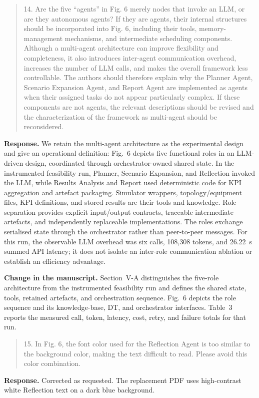 \documentclass[11pt]{article}
\newenvironment{reviewercomment}{\begin{quote}\color{reviewblue}}{\end{quote}}
\newenvironment{authorresponse}{\color{responsegreen}\textbf{Response.} }{\par\color{black}}
\newcommand{\change}[1]{\par\textbf{Change in the manuscript.} #1\par}
\begin{document}
\begin{reviewercomment}
14. Are the five ``agents'' in Fig. 6 merely nodes that invoke an LLM, or are they autonomous agents? If they are agents, their internal structures should be incorporated into Fig. 6, including their tools, memory-management mechanisms, and intermediate scheduling components. Although a multi-agent architecture can improve flexibility and completeness, it also introduces inter-agent communication overhead, increases the number of LLM calls, and makes the overall framework less controllable. The authors should therefore explain why the Planner Agent, Scenario Expansion Agent, and Report Agent are implemented as agents when their assigned tasks do not appear particularly complex. If these components are not agents, the relevant descriptions should be revised and the characterization of the framework as multi-agent should be reconsidered.
\end{reviewercomment}
\begin{authorresponse}
We retain the multi-agent architecture as the experimental design and give an operational definition: Fig.~6 depicts five functional roles in an LLM-driven design, coordinated through orchestrator-owned shared state. In the instrumented feasibility run, Planner, Scenario Expansion, and Reflection invoked the LLM, while Results Analysis and Report used deterministic code for KPI aggregation and artefact packaging. Simulator wrappers, topology/equipment files, KPI definitions, and stored results are their tools and knowledge. Role separation provides explicit input/output contracts, traceable intermediate artefacts, and independently replaceable implementations. The roles exchange serialised state through the orchestrator rather than peer-to-peer messages. For this run, the observable LLM overhead was six calls, 108,308 tokens, and 26.22~s summed API latency; it does not isolate an inter-role communication ablation or establish an efficiency advantage.
\end{authorresponse}
\change{Section~V-A distinguishes the five-role architecture from the instrumented feasibility run and defines the shared state, tools, retained artefacts, and orchestration sequence. Fig.~6 depicts the role sequence and its knowledge-base, DT, and orchestrator interfaces. Table~3 reports the measured call, token, latency, cost, retry, and failure totals for that run.}

\begin{reviewercomment}
15. In Fig. 6, the font color used for the Reflection Agent is too similar to the background color, making the text difficult to read. Please avoid this color combination.
\end{reviewercomment}
\begin{authorresponse}
Corrected as requested. The replacement PDF uses high-contrast white Reflection text on a dark blue background.
\end{authorresponse}
\end{document}
